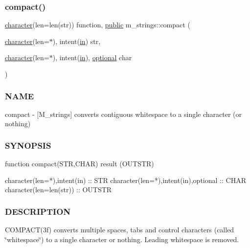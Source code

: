 \subsubsection{\texorpdfstring{compact()}{compact()}}
{\footnotesize\ttfamily \hyperlink{option__stopwatch_83_8txt_abd4b21fbbd175834027b5224bfe97e66}{character}(len=len(str)) function, \hyperlink{M__stopwatch_83_8txt_a2f74811300c361e53b430611a7d1769f}{public} m\+\_\+strings\+::compact (\begin{DoxyParamCaption}\item[{\hyperlink{option__stopwatch_83_8txt_abd4b21fbbd175834027b5224bfe97e66}{character}(len=$\ast$), intent(\hyperlink{M__journal_83_8txt_afce72651d1eed785a2132bee863b2f38}{in})}]{str,  }\item[{\hyperlink{option__stopwatch_83_8txt_abd4b21fbbd175834027b5224bfe97e66}{character}(len=$\ast$), intent(\hyperlink{M__journal_83_8txt_afce72651d1eed785a2132bee863b2f38}{in}), \hyperlink{option__stopwatch_83_8txt_aa4ece75e7acf58a4843f70fe18c3ade5}{optional}}]{char }\end{DoxyParamCaption})}



\subsubsection*{N\+A\+ME}

compact -\/ \mbox{[}M\+\_\+strings\mbox{]} converts contiguous whitespace to a single character (or nothing) 

\subsubsection*{S\+Y\+N\+O\+P\+S\+IS}

\begin{DoxyVerb}function compact(STR,CHAR) result (OUTSTR)

 character(len=*),intent(in)          :: STR
 character(len=*),intent(in),optional :: CHAR
 character(len=len(str))              :: OUTSTR
\end{DoxyVerb}


\subsubsection*{D\+E\+S\+C\+R\+I\+P\+T\+I\+ON}

C\+O\+M\+P\+A\+C\+T(3f) converts multiple spaces, tabs and control characters (called \char`\"{}whitespace\char`\"{}) to a single character or nothing. Leading whitespace is removed.


